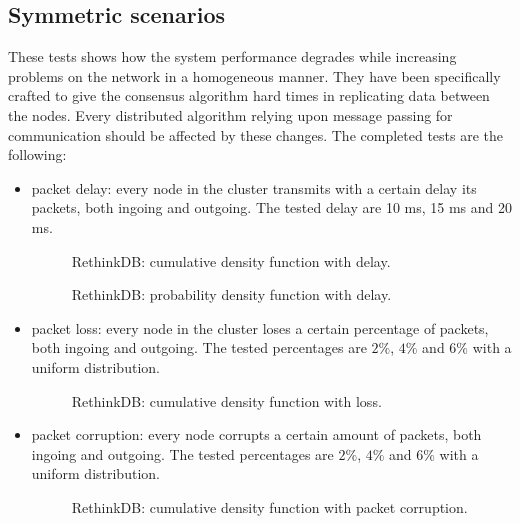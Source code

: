 \subsection{Symmetric scenarios}
These tests shows how the system performance degrades while increasing problems on the network in a homogeneous manner. They have been specifically crafted to give the consensus algorithm hard times in replicating data between the nodes. Every distributed algorithm relying upon message passing for communication should be affected by these changes. The completed tests are the following:

\begin{itemize}
    \item packet delay: every node in the cluster transmits with a certain delay its packets, both ingoing and outgoing. The tested delay are 10 ms, 15 ms and 20 ms.

    \begin{figure}[H]
      \caption{RethinkDB: cumulative density function with delay.}
      \label{delay}
    \end{figure}

    \begin{figure}[H]
      \caption{RethinkDB: probability density function with delay.}
      \label{delay_distr}
    \end{figure}

    \item packet loss: every node in the cluster loses a certain percentage of packets, both ingoing and outgoing. The tested percentages are \(2\%\), \(4\%\) and \(6\%\) with a uniform distribution.

    \begin{figure}[H]
      \caption{RethinkDB: cumulative density function with loss.}
      \label{loss}
    \end{figure}

    \item packet corruption: every node corrupts a certain amount of packets, both ingoing and outgoing. The tested percentages are \(2\%\), \(4\%\) and \(6\%\) with a uniform distribution.

    \begin{figure}[H]
      \caption{RethinkDB: cumulative density function with packet corruption.}
      \label{corruption}
    \end{figure}


\end{itemize}
